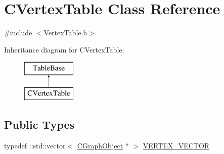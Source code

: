 \hypertarget{class_c_vertex_table}{}\section{C\+Vertex\+Table Class Reference}
\label{class_c_vertex_table}


{\ttfamily \#include $<$Vertex\+Table.\+h$>$}

Inheritance diagram for C\+Vertex\+Table\+:\begin{figure}[H]
\begin{center}
\leavevmode
\includegraphics[height=2.000000cm]{class_c_vertex_table}
\end{center}
\end{figure}
\subsection*{Public Types}
\begin{DoxyCompactItemize}
\item 
typedef \+::std\+::vector$<$ \hyperlink{class_c_graph_object}{C\+Graph\+Object} $\ast$ $>$ \hyperlink{class_c_vertex_table_a0d1b76467f2add225225fddebafc68f9}{V\+E\+R\+T\+E\+X\+\_\+\+V\+E\+C\+T\+O\+R}
\end{DoxyCompactItemize}
